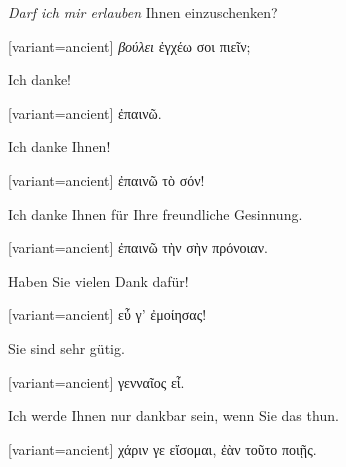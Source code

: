 \emph{Darf ich mir erlauben} Ihnen einzuschenken?

\switchcolumn

\begin{greek}[variant=ancient]%
\emph{βούλει} ἐγχέω σοι πιεῖν;

\end{greek}%
\indent Ich danke!

\switchcolumn

\begin{greek}[variant=ancient]%
ἐπαινῶ.

\end{greek}%
\switchcolumn*

Ich danke Ihnen!

\switchcolumn

\begin{greek}[variant=ancient]%
ἐπαινῶ τὸ σόν!

\end{greek}%
\switchcolumn*

Ich danke Ihnen für Ihre freundliche Gesinnung.

\switchcolumn

\begin{greek}[variant=ancient]%
ἐπαινῶ τὴν σὴν πρόνοιαν.

\end{greek}%
\switchcolumn*

Haben Sie vielen Dank dafür!

\switchcolumn

\begin{greek}[variant=ancient]%
εὖ γ' ἐμοίησας!

\end{greek}%
\switchcolumn*

Sie sind sehr gütig.

\switchcolumn

\begin{greek}[variant=ancient]%
γενναῖος εἶ.

\end{greek}%
\switchcolumn*

Ich werde Ihnen nur dankbar sein, wenn Sie das thun.

\switchcolumn

\begin{greek}[variant=ancient]%
χάριν γε εἴσομαι, ἐὰν τοῦτο ποιῇς.

\end{greek}%
\switchcolumn*

